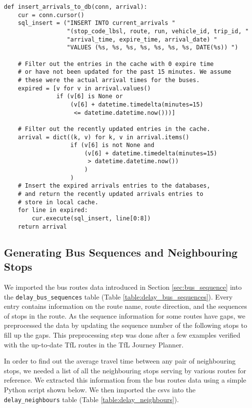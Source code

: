 \begin{verbatim}
def insert_arrivals_to_db(conn, arrival):
    cur = conn.cursor()
    sql_insert = ("INSERT INTO current_arrivals "
                  "(stop_code_lbsl, route, run, vehicle_id, trip_id, "
                  "arrival_time, expire_time, arrival_date) "
                  "VALUES (%s, %s, %s, %s, %s, %s, %s, DATE(%s)) ")

    # Filter out the entries in the cache with 0 expire time
    # or have not been updated for the past 15 minutes. We assume
    # these were the actual arrival times for the buses.
    expired = [v for v in arrival.values()
               if (v[6] is None or
                   (v[6] + datetime.timedelta(minutes=15)
                    <= datetime.datetime.now()))]

    # Filter out the recently updated entries in the cache.
    arrival = dict((k, v) for k, v in arrival.items()
                   if (v[6] is not None and
                       (v[6] + datetime.timedelta(minutes=15)
                        > datetime.datetime.now())
                       )
                   )
    # Insert the expired arrivals entries to the databases,
    # and return the recently updated arrivals entries to
    # store in local cache.
    for line in expired:
        cur.execute(sql_insert, line[0:8])
    return arrival
\end{verbatim}


\subsection{Generating Bus Sequences and Neighbouring Stops}
\label{sec:bus_stop_locations_routes}
\par We imported the bus routes data introduced in Section \ref{sec:bus_sequence} into the \texttt{delay\_bus\_sequences} table (Table \ref{table:delay_bus_sequences}). Every entry contains information on the route name, route direction, and the sequences of stops in the route. As the sequence information for some routes have gaps, we preprocessed the data by updating the sequence number of the following stops to fill up the gaps. This preprocessing step was done after a few examples verified with the up-to-date TfL routes in the TfL Journey Planner.

\par In order to find out the average travel time between any pair of neighbouring stops, we needed a list of all the neighbouring stops serving by various routes for reference. We extracted this information from the bus routes data using a simple Python script shown below. We then imported the \acrshort{csv}s into the \texttt{delay\_neighbours} table (Table \ref{table:delay_neighbours}).

